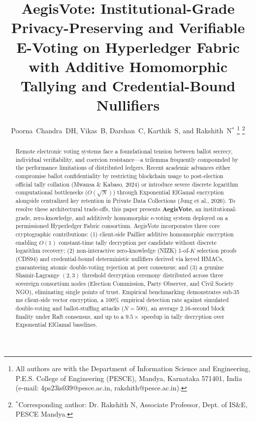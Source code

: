 \documentclass[journal,10pt,twocolumn]{IEEEtran}
\begin{document}
\title{AegisVote: Institutional-Grade Privacy-Preserving and Verifiable E-Voting on Hyperledger Fabric with Additive Homomorphic Tallying and Credential-Bound Nullifiers}

\author{Poorna~Chandra~DH, Vikas~B, Darshan~C, Karthik~S, and Rakshith~N$^*$%
\thanks{All authors are with the Department of Information Science and Engineering, P.E.S. College of Engineering (PESCE), Mandya, Karnataka 571401, India (e-mail: 4ps23is039@pesce.ac.in, rakshith@pesce.ac.in).}%
\thanks{$^*$Corresponding author: Dr. Rakshith N, Associate Professor, Dept. of IS\&E, PESCE Mandya.}
}

\maketitle

\begin{abstract}
Remote electronic voting systems face a foundational tension between ballot secrecy, individual verifiability, and coercion resistance---a trilemma frequently compounded by the performance limitations of distributed ledgers. Recent academic advances either compromise ballot confidentiality by restricting blockchain usage to post-election official tally collation (Mwansa \& Kabaso, 2024) or introduce severe discrete logarithm computational bottlenecks ($O(\sqrt{N})$) through Exponential ElGamal encryption alongside centralized key retention in Private Data Collections (Jung et al., 2026). To resolve these architectural trade-offs, this paper presents \textbf{AegisVote}, an institutional-grade, zero-knowledge, and additively homomorphic e-voting system deployed on a permissioned Hyperledger Fabric consortium. AegisVote incorporates three core cryptographic contributions: (1) client-side Paillier additive homomorphic encryption enabling $O(1)$ constant-time tally decryption per candidate without discrete logarithm recovery; (2) non-interactive zero-knowledge (NIZK) 1-of-$K$ selection proofs (CDS94) and credential-bound deterministic nullifiers derived via keyed HMACs, guaranteeing atomic double-voting rejection at peer consensus; and (3) a genuine Shamir-Lagrange $(2, 3)$ threshold decryption ceremony distributed across three sovereign consortium nodes (Election Commission, Party Observer, and Civil Society NGO), eliminating single points of trust. Empirical benchmarking demonstrates sub-35\,ms client-side vector encryption, a 100\% empirical detection rate against simulated double-voting and ballot-stuffing attacks ($N=500$), an average 2.16-second block finality under Raft consensus, and up to a $9.5\times$ speedup in tally decryption over Exponential ElGamal baselines.
\end{abstract}
\end{document}
